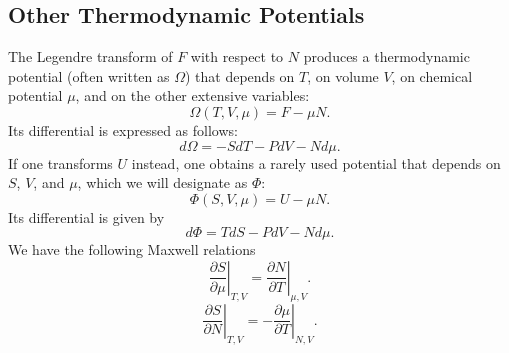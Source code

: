 \subsection{Other Thermodynamic Potentials}
The Legendre transform of $F$ with respect to $N$ produces a thermodynamic potential (often written as $\Omega$) that depends on $T$, on volume $V$, on chemical potential $\mu$, and on the other extensive variables:
\[\Omega(T,V,\mu) = F - \mu N.\]
Its differential is expressed as follows:
\[d\Omega = -SdT - PdV - Nd\mu.\]
If one transforms $U$ instead, one obtains a rarely used potential that depends on $S$, $V$, and $\mu$, which we will designate as $\Phi$:
\[\Phi(S,V,\mu) = U - \mu N.\]
Its differential is given by
\[d\Phi = TdS - PdV - Nd\mu.\]
We have the following Maxwell relations
\[\left. \frac{\partial S}{\partial \mu} \right|_{T,V} = \left. \frac{\partial N}{\partial T} \right|_{\mu,V}.\]
\[\left. \frac{\partial S}{\partial N} \right|_{T,V} = - \left. \frac{\partial \mu}{\partial T} \right|_{N,V}.\]

